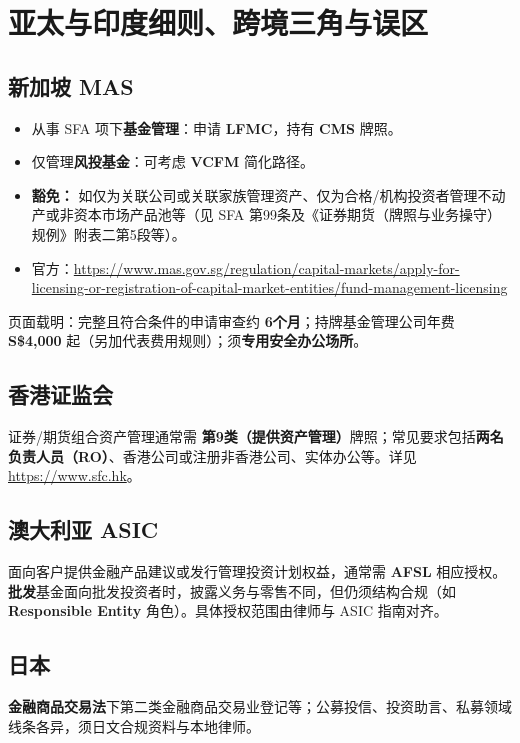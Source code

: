 \chapter{亚太与印度细则、跨境三角与误区}

\section{新加坡 MAS}

\begin{itemize}
  \item 从事 SFA 项下\textbf{基金管理}：申请 \textbf{LFMC}，持有 \textbf{CMS} 牌照。
  \item 仅管理\textbf{风投基金}：可考虑 \textbf{VCFM} 简化路径。
  \item \textbf{豁免：} 如仅为关联公司或关联家族管理资产、仅为合格/机构投资者管理不动产或非资本市场产品池等（见 SFA 第99条及《证券期货（牌照与业务操守）规例》附表二第5段等）。
  \item 官方：\url{https://www.mas.gov.sg/regulation/capital-markets/apply-for-licensing-or-registration-of-capital-market-entities/fund-management-licensing}
\end{itemize}

页面载明：完整且符合条件的申请审查约 \textbf{6个月}；持牌基金管理公司年费 \textbf{S\$4{,}000} 起（另加代表费用规则）；须\textbf{专用安全办公场所}。

\section{香港证监会}

证券/期货组合资产管理通常需 \textbf{第9类（提供资产管理）}牌照；常见要求包括\textbf{两名负责人员（RO）}、香港公司或注册非香港公司、实体办公等。详见 \url{https://www.sfc.hk}。

\section{澳大利亚 ASIC}

面向客户提供金融产品建议或发行管理投资计划权益，通常需 \textbf{AFSL} 相应授权。\textbf{批发}基金面向批发投资者时，披露义务与零售不同，但仍须结构合规（如 \textbf{Responsible Entity} 角色）。具体授权范围由律师与 ASIC 指南对齐。

\section{日本}

\textbf{金融商品交易法}下第二类金融商品交易业登记等；公募投信、投资助言、私募领域线条各异，须日文合规资料与本地律师。

